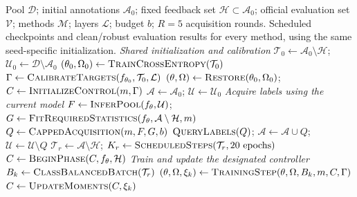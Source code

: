 \documentclass[a4paper,fleqn]{cas-dc}
\let\CAENLcaption\caption
\let\CAENLalgorithmcaption\caption
\let\caption\CAENLcaption
\newcommand{\model}{C\AE{}NL}
\begin{document}
\begin{algorithm*}[p]
\small
\let\caption\CAENLalgorithmcaption
\caption{\textbf{\model{} active learning with within-phase representation control}}
\label{alg:caenl_loop}
\begin{algorithmic}[1]
\Require Pool $\mathcal D$; initial annotations $\mathcal A_0$; fixed feedback
set $\mathcal H\subset\mathcal A_0$; official evaluation set $\mathcal V$;
methods $\mathcal M$; layers $\mathcal L$; budget $b$; $R=5$ acquisition rounds.
\Ensure Scheduled checkpoints and clean/robust evaluation results for every
method, using the same seed-specific initialization.
\Statex \textit{Shared initialization and calibration}
\State $\mathcal T_0\gets\mathcal A_0\setminus\mathcal H$;
       $\mathcal U_0\gets\mathcal D\setminus\mathcal A_0$
\State $(\theta_0,\Omega_0)\gets\Call{TrainCrossEntropy}{\mathcal T_0}$
\State $\Gamma\gets\Call{CalibrateTargets}{f_{\theta_0},\mathcal T_0,\mathcal L}$
    \State $(\theta,\Omega)\gets\Call{Restore}{\theta_0,\Omega_0}$;
        $C\gets\Call{InitializeControl}{m,\Gamma}$
    \State $\mathcal A\gets\mathcal A_0$; $\mathcal U\gets\mathcal U_0$
        \Statex \hspace{2.6em}\textit{Acquire labels using the current model}
        \State $F\gets\Call{InferPool}{f_\theta,\mathcal U}$;
            $G\gets\Call{FitRequiredStatistics}{f_\theta,\mathcal A\setminus\mathcal H,m}$
        \State $Q\gets\Call{CappedAcquisition}{m,F,G,b}$
        \State $\Call{QueryLabels}{Q}$;
            $\mathcal A\gets\mathcal A\cup Q$;
            $\mathcal U\gets\mathcal U\setminus Q$
        \State $\mathcal T_r\gets\mathcal A\setminus\mathcal H$;
            $K_r\gets\Call{ScheduledSteps}{\mathcal T_r,20\ \mathrm{epochs}}$
        \State $C\gets\Call{BeginPhase}{C,f_\theta,\mathcal H}$
        \Statex \hspace{2.6em}\textit{Train and update the designated controller}
            \State $B_k\gets\Call{ClassBalancedBatch}{\mathcal T_r}$
            \State $(\theta,\Omega,\xi_k)\gets\Call{TrainingStep}{\theta,\Omega,B_k,m,C,\Gamma}$
            \State $C\gets\Call{UpdateMoments}{C,\xi_k}$

\end{algorithmic}
\end{algorithm*}
\end{document}
